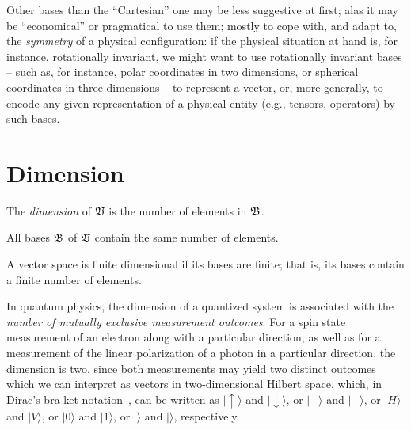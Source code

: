 Other bases than the ``Cartesian'' one may be less suggestive at first; alas it may be ``economical'' or pragmatical to use them;
mostly to cope with, and adapt to, the {\em symmetry} of a physical configuration:
if the physical situation at hand is, for instance, rotationally invariant,
we might want to use rotationally invariant bases --
such as, for instance, polar coordinates in two dimensions, or spherical coordinates in three dimensions --
to represent a vector, or, more generally, to encode any given representation of a physical entity
(e.g., tensors, operators) by such bases.


\section{Dimension}
The {\em dimension}
of $\frak V$ is the number of elements in $\frak B$.

All bases $\frak B$ of $\frak V$ contain the same number of elements.

A vector space is finite dimensional if its bases are finite; that is, its bases
contain a finite number of elements.

{\color{Purple}
In quantum physics, the dimension of a quantized system is associated with
the {\em number of mutually exclusive measurement outcomes}.
For a spin state measurement of an electron
along with a particular direction,
as well as for a measurement of the linear polarization
of a photon in a particular direction,
the dimension is two, since both measurements
may yield two distinct outcomes
which we can
interpret as vectors in two-dimensional Hilbert space,
which, in Dirac's bra-ket notation~\cite{dirac}, can be written as
$
\vert \uparrow \rangle$ and $\vert \downarrow \rangle$,
or $\vert + \rangle$ and $
\vert - \rangle
$,
or
$
\vert H \rangle $ and $
\vert V \rangle
$,
or
$
\vert 0 \rangle $ and $
\vert 1 \rangle
$,
or
$
\bigg|$\raisebox{-0.4\height}{\begin{tikzpicture}
    \emoticon\pupils
    \draw[very thick,red,line cap=round] (-1ex,-1ex)
               ..controls (-0.5ex,-1.5ex)and(0.5ex,-1.5ex)..(1ex,-1ex);
    \draw (0.60ex,1.20ex)--(0.60ex,1.60ex)
          (0.85ex,1.25ex)--(0.95ex,1.45ex)
          (1.00ex,1.00ex)--(1.20ex,1.10ex)
          (0.35ex,1.15ex)--(0.25ex,1.35ex)
          (-0.60ex,1.20ex)--(-0.60ex,1.60ex)
          (-0.85ex,1.25ex)--(-0.95ex,1.45ex)
          (-1.00ex,1.00ex)--(-1.20ex,1.10ex)
          (-0.35ex,1.15ex)--(-0.25ex,1.35ex);
\end{tikzpicture}}$\bigg\rangle $ and $
\bigg|$\raisebox{-0.4\height}{\begin{tikzpicture}
\emoticon\pupils
    \fill[shift={( 0.5ex,0.5ex)},rotate=90] (0,0) ellipse (0.3ex and 0.15ex);
    \fill[shift={(-0.5ex,0.5ex)},rotate=90] (0,0) ellipse (0.3ex and 0.15ex);
    \draw[thick] (-1ex,-1ex)..controls
        (-0.5ex,-0.5ex)and(0.5ex,-0.5ex)..(1ex,-1ex);
    \draw[thick] (0.2ex,1.15ex)--(0.5ex,1.6ex)(-0.2ex,1.15ex)--(-0.5ex,1.6ex);
\end{tikzpicture}}$\bigg\rangle
$,
respectively.
}

